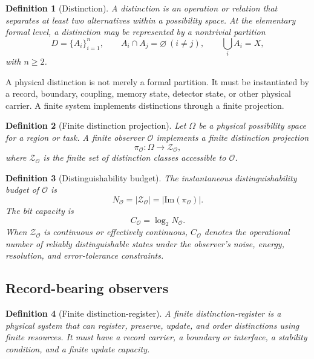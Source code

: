\documentclass[10pt,a4paper,twocolumn,aps,prl]{revtex4-2}
\newtheorem{definition}{Definition}
\newcommand{\Obs}{\mathcal{O}}
\newcommand{\NA}{N_{\Obs}}
\newcommand{\CA}{C_{\Obs}}
\begin{document}
\begin{definition}[Distinction]
A distinction is an operation or relation that separates at least two alternatives within a possibility space. At the elementary formal level, a distinction may be represented by a nontrivial partition
\begin{equation}
D=\{A_i\}_{i=1}^{n},\qquad A_i\cap A_j=\varnothing\ (i\neq j),\qquad \bigcup_i A_i=X,
\end{equation}
with $n\geq 2$.
\end{definition}

A physical distinction is not merely a formal partition. It must be instantiated by a record, boundary, coupling, memory state, detector state, or other physical carrier. A finite system implements distinctions through a finite projection.

\begin{definition}[Finite distinction projection]
Let $\Omega$ be a physical possibility space for a region or task. A finite observer $\Obs$ implements a finite distinction projection
\begin{equation}
\pi_{\Obs}:\Omega\rightarrow \mathcal{Z}_{\Obs},
\end{equation}
where $\mathcal{Z}_{\Obs}$ is the finite set of distinction classes accessible to $\Obs$.
\end{definition}

\begin{definition}[Distinguishability budget]
The instantaneous distinguishability budget of $\Obs$ is
\begin{equation}
\NA=|\mathcal{Z}_{\Obs}|=|\mathrm{Im}(\pi_{\Obs})|.
\end{equation}
The bit capacity is
\begin{equation}
\CA=\log_2\NA.
\end{equation}
When $\mathcal{Z}_{\Obs}$ is continuous or effectively continuous, $\CA$ denotes the operational number of reliably distinguishable states under the observer's noise, energy, resolution, and error-tolerance constraints.
\end{definition}

\subsection{Record-bearing observers}

\begin{definition}[Finite distinction-register]
A finite distinction-register is a physical system that can register, preserve, update, and order distinctions using finite resources. It must have a record carrier, a boundary or interface, a stability condition, and a finite update capacity.
\end{definition}
\end{document}
